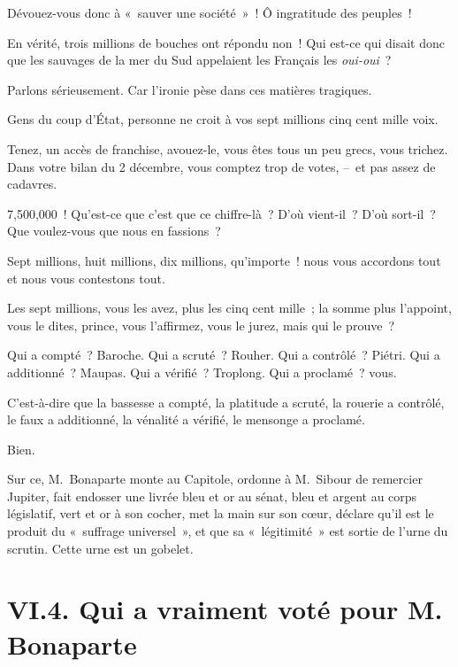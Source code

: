 \documentclass[french,twoside]{book} %
\begin{document}
Dévouez-vous donc à « sauver une société » ! Ô ingratitude des peuples !\par
En vérité, trois millions de bouches ont répondu non ! Qui est-ce qui disait donc que les sauvages de la mer du Sud appelaient les Français les \emph{oui-oui} ?\par
Parlons sérieusement. Car l’ironie pèse dans ces matières tragiques.\par
Gens du coup d’État, personne ne croit à vos sept millions cinq cent mille voix.\par
Tenez, un accès de franchise, avouez-le, vous êtes tous un peu grecs, vous trichez. Dans votre bilan du 2 décembre, vous comptez trop de votes, – et pas assez de cadavres.\par
7,500,000 ! Qu’est-ce que c’est que ce chiffre-là ? D’où vient-il ? D’où sort-il ? Que voulez-vous que nous en fassions ?\par
Sept millions, huit millions, dix millions, qu’importe ! nous vous accordons tout et nous vous contestons tout.\par
Les sept millions, vous les avez, plus les cinq cent mille ; la somme plus l’appoint, vous le dites, prince, vous l’affirmez, vous le jurez, mais qui le prouve ?\par
Qui a compté ? Baroche. Qui a scruté ? Rouher. Qui a contrôlé ? Piétri. Qui a additionné ? Maupas. Qui a vérifié ? Troplong. Qui a proclamé ? vous.\par
C’est-à-dire que la bassesse a compté, la platitude a scruté, la rouerie a contrôlé, le faux a additionné, la vénalité a vérifié, le mensonge a proclamé.\par
Bien.\par
Sur ce, M. Bonaparte monte au Capitole, ordonne à M. Sibour de remercier Jupiter, fait endosser une livrée bleu et or au sénat, bleu et argent au corps législatif, vert et or à son cocher, met la main sur son cœur, déclare qu’il est le produit du « suffrage universel », et que sa « légitimité » est sortie de l’urne du scrutin. Cette urne est un gobelet.

\section[{VI.4. Qui a vraiment voté pour M. Bonaparte}]{VI.4. Qui a vraiment voté pour M. Bonaparte}
\end{document}
